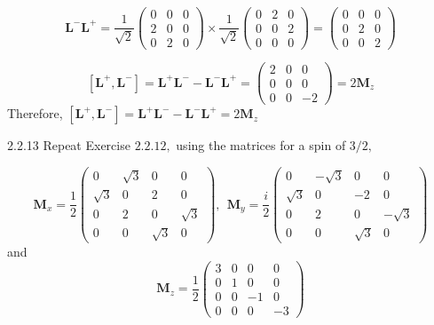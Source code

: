 \documentclass{article}
\begin{document}
\begin{flushleft}
$$
\mathbf{L}^{-} \mathbf{L}^{+}=\frac{1}{\sqrt{2}}\left(\begin{array}{lll}
0 & 0 & 0 \\
2 & 0 & 0 \\
0 & 2 & 0
\end{array}\right) \times \frac{1}{\sqrt{2}}\left(\begin{array}{lll}
0 & 2 & 0 \\
0 & 0 & 2 \\
0 & 0 & 0
\end{array}\right)=\left(\begin{array}{lll}
0 & 0 & 0 \\
0 & 2 & 0 \\
0 & 0 & 2
\end{array}\right)
$$

$$
\left[\mathbf{L}^{+}, \mathbf{L}^{-}\right]=\mathbf{L}^{+} \mathbf{L}^{-}-\mathbf{L}^{-} \mathbf{L}^{+}=\left(\begin{array}{ccc}
2 & 0 & 0 \\
0 & 0 & 0 \\
0 & 0 & -2
\end{array}\right)=2 \mathbf{M}_{z}
$$
Therefore, $\left[\mathbf{L}^{+}, \mathbf{L}^{-}\right]=\mathbf{L}^{+} \mathbf{L}^{-}-\mathbf{L}^{-} \mathbf{L}^{+}=2 \mathbf{M}_{z}$











\begin{mybox}{2.2.13}
Repeat Exercise $2.2 .12,$ using the matrices for a spin of $3 / 2,$

$$
\mathbf{M}_{x}=\frac{1}{2}\left(\begin{array}{cccc}
0 & \sqrt{3} & 0 & 0 \\
\sqrt{3} & 0 & 2 & 0 \\
0 & 2 & 0 & \sqrt{3} \\
0 & 0 & \sqrt{3} & 0
\end{array}\right), \ \ \mathbf{M}_{y}=\frac{i}{2}\left(\begin{array}{cccc}
0 & -\sqrt{3} & 0 & 0 \\
\sqrt{3} & 0 & -2 & 0 \\
0 & 2 & 0 & -\sqrt{3} \\
0 & 0 & \sqrt{3} & 0
\end{array}\right)
$$
and
$$
\mathbf{M}_{z}=\frac{1}{2}\left(\begin{array}{rrrr}
3 & 0 & 0 & 0 \\
0 & 1 & 0 & 0 \\
0 & 0 & -1 & 0 \\
0 & 0 & 0 & -3
\end{array}\right)
$$
\end{mybox}



\end{flushleft}
\end{document}

